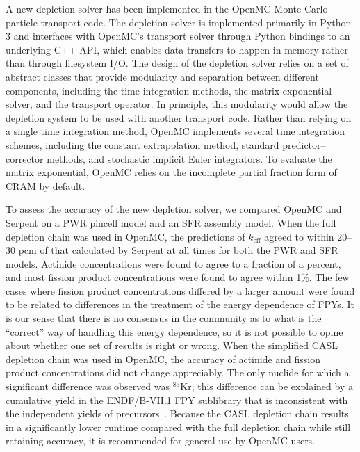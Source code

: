\documentclass[3p,authoryear]{elsarticle}
\begin{document}
A new depletion solver has been implemented in the OpenMC Monte Carlo particle
transport code. The depletion solver is implemented primarily in Python 3 and
interfaces with OpenMC's transport solver through Python bindings to an
underlying C++ API, which enables data transfers to happen in memory rather than
through filesystem I/O. The design of the depletion solver relies on a set of
abstract classes that provide modularity and separation between different
components, including the time integration methods, the matrix exponential
solver, and the transport operator. In principle, this modularity would allow
the depletion system to be used with another transport code. Rather than relying
on a single time integration method, OpenMC implements several time integration
schemes, including the constant extrapolation method, standard
predictor--corrector methods, and stochastic implicit Euler integrators. To
evaluate the matrix exponential, OpenMC relies on the incomplete partial
fraction form of CRAM by default.

To assess the accuracy of the new depletion solver, we compared OpenMC and
Serpent on a PWR pincell model and an SFR assembly model. When the full
depletion chain was used in OpenMC, the predictions of $k_\text{eff}$ agreed to
within 20--30 pcm of that calculated by Serpent at all times for both the PWR
and SFR models. Actinide concentrations were found to agree to a fraction of a
percent, and most fission product concentrations were found to agree within 1\%.
The few cases where fission product concentrations differed by a larger amount
were found to be related to differences in the treatment of the energy
dependence of FPYs. It is our sense that there is no consensus in the community
as to what is the ``correct'' way of handling this energy dependence, so it is
not possible to opine about whether one set of results is right or wrong. When
the simplified CASL depletion chain was used in OpenMC, the accuracy of actinide
and fission product concentrations did not change appreciably. The only nuclide
for which a significant difference was observed was $^{85}$Kr; this difference
can be explained by a cumulative yield in the ENDF/B-VII.1 FPY sublibrary that
is inconsistent with the independent yields of precursors~\citep{pigni2015nds}.
Because the CASL depletion chain results in a significantly lower runtime
compared with the full depletion chain while still retaining accuracy, it is
recommended for general use by OpenMC users.
\end{document}
